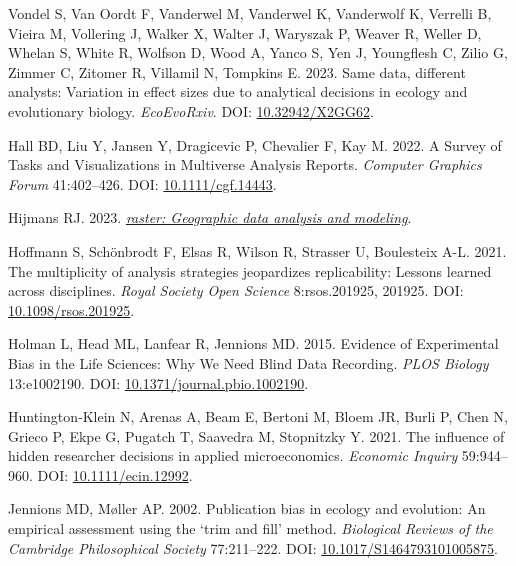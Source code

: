 \documentclass[10pt,a4paper]{article}
\newlength{\cslhangindent}
\newlength{\cslentryspacingunit} %
\newenvironment{CSLReferences}[2] %
 {%
  \setlength{\parindent}{0pt}
  \ifodd #1
  \let\oldpar\par
  \def\par{\hangindent=\cslhangindent\oldpar}
  \fi
  \setlength{\parskip}{#2\cslentryspacingunit}
 }%
 {}
\begin{document}
\begin{CSLReferences}{1}{0}
Vondel S, Van Oordt F, Vanderwel M, Vanderwel K, Vanderwolf K, Verrelli B, Vieira M, Vollering J, Walker X, Walter J, Waryszak P, Weaver R, Weller D, Whelan S, White R, Wolfson D, Wood A, Yanco S, Yen J, Youngflesh C, Zilio G, Zimmer C, Zitomer R, Villamil N, Tompkins E. 2023. Same data, different analysts: Variation in effect sizes due to analytical decisions in ecology and evolutionary biology. \emph{EcoEvoRxiv}. DOI: \href{https://doi.org/10.32942/X2GG62}{10.32942/X2GG62}.

Hall BD, Liu Y, Jansen Y, Dragicevic P, Chevalier F, Kay M. 2022. A {Survey} of {Tasks} and {Visualizations} in {Multiverse} {Analysis} {Reports}. \emph{Computer Graphics Forum} 41:402--426. DOI: \href{https://doi.org/10.1111/cgf.14443}{10.1111/cgf.14443}.

Hijmans RJ. 2023. \emph{\href{https://CRAN.R-project.org/package=raster}{{raster}: Geographic data analysis and modeling}}.

Hoffmann S, Schönbrodt F, Elsas R, Wilson R, Strasser U, Boulesteix A-L. 2021. The multiplicity of analysis strategies jeopardizes replicability: Lessons learned across disciplines. \emph{Royal Society Open Science} 8:rsos.201925, 201925. DOI: \href{https://doi.org/10.1098/rsos.201925}{10.1098/rsos.201925}.

Holman L, Head ML, Lanfear R, Jennions MD. 2015. Evidence of {Experimental} {Bias} in the {Life} {Sciences}: {Why} {We} {Need} {Blind} {Data} {Recording}. \emph{PLOS Biology} 13:e1002190. DOI: \href{https://doi.org/10.1371/journal.pbio.1002190}{10.1371/journal.pbio.1002190}.

Huntington‐Klein N, Arenas A, Beam E, Bertoni M, Bloem JR, Burli P, Chen N, Grieco P, Ekpe G, Pugatch T, Saavedra M, Stopnitzky Y. 2021. The influence of hidden researcher decisions in applied microeconomics. \emph{Economic Inquiry} 59:944--960. DOI: \href{https://doi.org/10.1111/ecin.12992}{10.1111/ecin.12992}.

Jennions MD, Møller AP. 2002. Publication bias in ecology and evolution: An empirical assessment using the `trim and fill' method. \emph{Biological Reviews of the Cambridge Philosophical Society} 77:211--222. DOI: \href{https://doi.org/10.1017/S1464793101005875}{10.1017/S1464793101005875}.


\end{CSLReferences}
\end{document}
